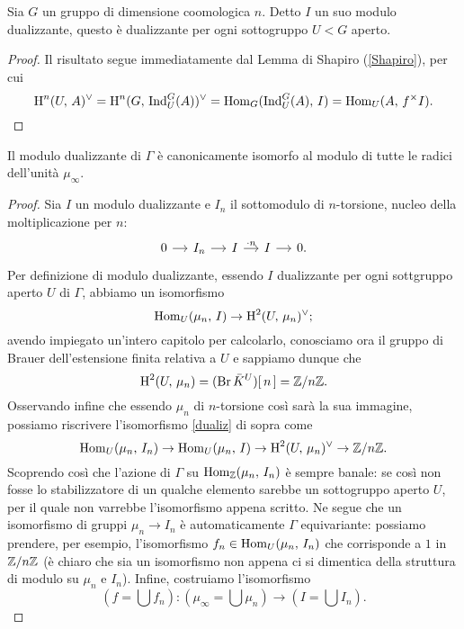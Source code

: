 

\begin{lemma}
	Sia $ G $ un gruppo di dimensione coomologica $ n $. Detto $ I $ un suo modulo dualizzante, questo è dualizzante per ogni sottogruppo $ U < G $ aperto.
\end{lemma}
\begin{proof}
	Il risultato segue immediatamente dal Lemma di Shapiro (\ref{Shapiro}), per cui
	\[ \operatorname{H}^n(U, \, A)^\vee = \operatorname{H}^n(G, \, \operatorname{Ind}_U^G(A))^\vee = \operatorname{Hom}_G(\operatorname{Ind}_U^G(A), \, I) = \operatorname{Hom}_U(A, \, f^\times I). \]
\end{proof}


\begin{proposition}
	Il modulo dualizzante di $ \Gamma $ è canonicamente isomorfo al modulo di tutte le radici dell'unità $ \mu_\infty $.
\end{proposition}
\begin{proof}
	Sia $ I $ un modulo dualizzante e $ I_n $ il sottomodulo di $ n $-torsione, nucleo della moltiplicazione per $ n $:
	\[ \begin{tikzcd}[column sep = small]
	0 \rar & I_n \rar & I \rar["\cdot n"] & I \rar & 0.
	\end{tikzcd} \]
	Per definizione di modulo dualizzante, essendo $ I $ dualizzante per ogni sottgruppo aperto $ U $ di $ \Gamma $, abbiamo un isomorfismo
	\begin{equation}\label{dualiz}
	\operatorname{Hom}_U(\mu_n, \, I) \to \operatorname{H}^2(U, \, \mu_n)^\vee;
	\end{equation}
	avendo impiegato un'intero capitolo per calcolarlo, conosciamo ora il gruppo di Brauer dell'estensione finita relativa a $ U $ e sappiamo dunque che $$  \operatorname{H}^2(U, \, \mu_n) = (\operatorname{Br} \bar{K}^U)[\, n\, ] = \mathbb{Z}/n\mathbb{Z}.  $$
	Osservando infine che essendo $ \mu_n $ di $ n $-torsione così sarà la sua immagine, possiamo riscrivere l'isomorfismo \eqref{dualiz} di sopra come
	\[ \operatorname{Hom}_U(\mu_n, \, I_n) \to \operatorname{Hom}_U(\mu_n, \, I) \to \operatorname{H}^2(U, \, \mu_n)^\vee \to \mathbb{Z}/n\mathbb{Z}. \]
	Scoprendo così che l'azione di $ \Gamma $ su $ \operatorname{Hom}_{\mathbb{Z}}(\mu_n, \, I_n) $ è sempre banale: se così non fosse lo stabilizzatore di un qualche elemento sarebbe un sottogruppo aperto $ U $, per il quale non varrebbe l'isomorfismo appena scritto. Ne segue che un isomorfismo di gruppi $ \mu_n \to I_n $ è automaticamente $ \Gamma $ equivariante: possiamo prendere, per esempio, l'isomorfismo $ f_n \in \operatorname{Hom}_U(\mu_n, \, I_n) $ che corrisponde a $ 1 $ in $ \mathbb{Z}/n\mathbb{Z} $ (è chiaro che sia un isomorfismo non appena ci si dimentica della struttura di modulo su $ \mu_n $ e $ I_n $). Infine, costruiamo l'isomorfismo
	\[ \left(f = \bigcup f_n\right) \colon \left(\mu_\infty = \bigcup \mu_n\right) \to \left(I = \bigcup I_n\right).  \]
	
\end{proof}

